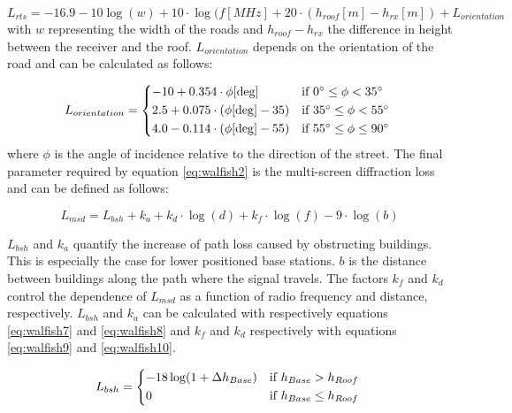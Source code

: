\begin{equation}
L_{rts}=-16.9-10\log(w)+10\cdot\log(f [MHz]+20\cdot( h_{roof}[m] - h_{rx} [m]) +L_{orientation}
\end{equation}
with $w$ representing the width of the roads and $h_{roof} - h_{rx}$ the difference in height between 
the receiver and the roof. $L_{orientation}$ depends on the orientation of the road 
and can be calculated as follows:

\begin{equation}
L_{orientation}=
\begin{cases*}
  -10+0.354\cdot \phi[\deg] & if $ 0^{\circ}\leq\phi<35^{\circ}$  \\
  2.5+0.075\cdot (\phi[\deg]-35) & if $ 35^{\circ}\leq\phi<55^{\circ}$ \\
  4.0-0.114\cdot (\phi[\deg]-55) &if $ 55^{\circ}\leq\phi\leq 90^{\circ}$ \\
\end{cases*}
\end{equation}
where $\phi$ is the angle of incidence relative to the direction of the
street. The final parameter required by equation \ref{eq:walfish2}
is the multi-screen diffraction loss and can be defined as follows:

\begin{equation}
L_{msd}=L_{bsh}+k_{a}+k_{d}\cdot \log(d) +k_{f}\cdot \log(f)-9\cdot \log(b)
\end{equation}

$L_{bsh}$ and $k_a$ quantify the increase of path loss caused by obstructing buildings. 
This is especially the case for lower positioned base stations. $b$ is the distance between buildings
along the path where the signal travels. The factors $k_f$ and $k_d$
control the dependence of $L_{msd}$ as a function of radio frequency and distance, respectively.
$L_{bsh}$ and $k_a$ can be calculated with respectively equations \ref{eq:walfish7} and \ref{eq:walfish8}
and $k_f$ and $k_d$ respectively with equations \ref{eq:walfish9} and \ref{eq:walfish10}.

\begin{equation}
L_{bsh}=
\begin{cases*}
 -18\log(1+\Delta h_{Base})   &if $ h_{Base}>h_{Roof}$\\
  0                           & if $h_{Base}\leq h_{Roof}$ \\
\end{cases*}
\label{eq:walfish7}
\end{equation}



